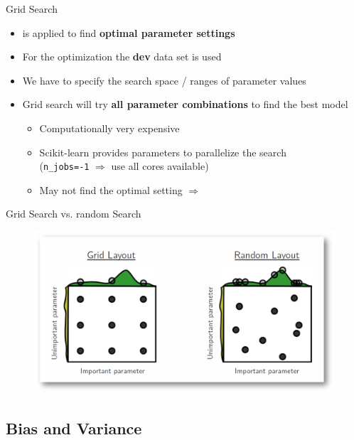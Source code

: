 \begin{frame}{Grid Search}{}
	\begin{itemize}
		\item {} is applied to find \textbf{optimal parameter settings}
		\item For the optimization the \textbf{dev} data set is used
		\item We have to specify the search space / ranges of parameter values
		\item Grid search will try \textbf{all parameter combinations} to find the best model
		\begin{itemize}
			\item Computationally very expensive
			\item Scikit-learn provides parameters to parallelize the search \\
				(\texttt{n\_jobs=-1} $\Rightarrow$ use all cores available)
			\item May not find the optimal setting $\Rightarrow$ 
		\end{itemize}
	\end{itemize}
\end{frame}


\begin{frame}{Grid Search vs. random Search}{}
	\begin{figure}
		\centering
		\includegraphics[scale=0.25]{09_evaluation/02_img/grid_random_search}
	\end{figure}
\end{frame}


\subsection{Bias and Variance}


